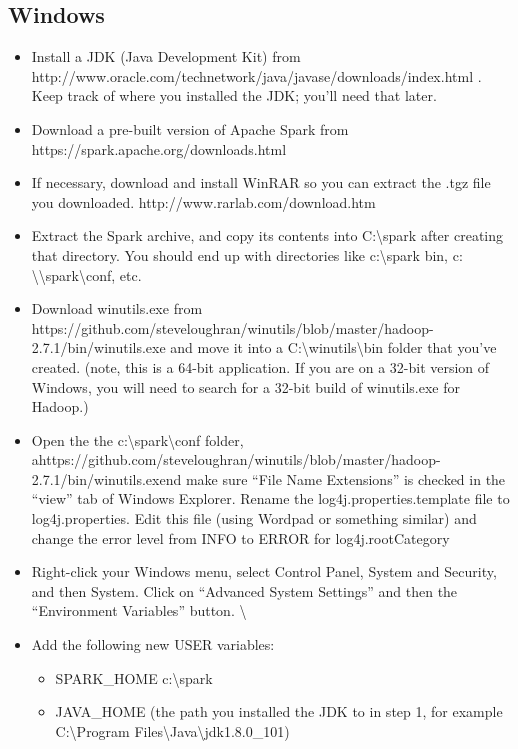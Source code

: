 \documentclass[]{article}
\begin{document}
\subsection{Windows}
\begin{itemize}
	
	\item Install a JDK (Java Development Kit) from http://www.oracle.com/technetwork/java/javase/downloads/index.html . Keep track of where you installed the JDK; you’ll need that later.
	\item Download a pre-built version of Apache Spark from https://spark.apache.org/downloads.html
	\item If necessary, download and install WinRAR so you can extract the .tgz file you downloaded. http://www.rarlab.com/download.htm
	\item Extract the Spark archive, and copy its contents into C:\textbackslash spark after creating that directory. You should end up with directories like c:\textbackslash spark bin, c: \textbackslash\textbackslash spark\textbackslash conf, etc.
	\item Download winutils.exe from https://github.com/steveloughran/winutils/blob/master/hadoop-2.7.1/bin/winutils.exe and move it into a C:\textbackslash winutils\textbackslash bin folder that you’ve created. (note, this is a 64-bit application. If you are on a 32-bit version of Windows, you will need to search for a 32-bit build of winutils.exe for Hadoop.)
	\item Open the the c:\textbackslash spark\textbackslash conf folder, ahttps://github.com/steveloughran/winutils/blob/master/hadoop-2.7.1/bin/winutils.exend make sure “File Name Extensions” is checked in the “view” tab of Windows Explorer. Rename the log4j.properties.template file to log4j.properties. Edit this file (using Wordpad or something similar) and change the error level from INFO to ERROR for log4j.rootCategory
	\item Right-click your Windows menu, select Control Panel, System and Security, and then System. Click on “Advanced System Settings” and then the “Environment Variables” button.
	\textbackslash
	\item Add the following new USER variables:
			\begin{itemize}
				\item SPARK\_HOME c:\textbackslash spark
				\item JAVA\_HOME (the path you installed the JDK to in step 1, for example C:\textbackslash Program Files\textbackslash Java\textbackslash jdk1.8.0\_101)

\end{itemize}
\end{itemize}
\end{document}
